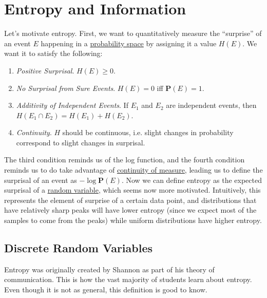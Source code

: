 \section{Entropy and Information}

  Let's motivate entropy. First, we want to quantitatively measure the ``surprise'' of an event $E$ happening in a \hyperref[prob-def:probability-space]{probability space} by assigning it a value $H(E)$. We want it to satisfy the following: 
  \begin{enumerate}
    \item \textit{Positive Surprisal}. $H(E) \geq 0$. 
    \item \textit{No Surprisal from Sure Events}. $H(E) = 0$ iff $\mathbf{P}(E) = 1$.
    \item \textit{Additivity of Independent Events}. If $E_1$ and $E_2$ are independent events, then $H(E_1 \cap E_2) = H(E_1) + H(E_2)$. 
    \item \textit{Continuity}. $H$ should be continuous, i.e. slight changes in probability correspond to slight changes in surprisal. 
  \end{enumerate}
  
  The third condition reminds us of the log function, and the fourth condition reminds us to do take advantage of \hyperref[mt-thm:continuity-of-measure]{continuity of measure}, leading us to define the surprisal of an event as $- \log \mathbf{P}(E)$. Now we can define entropy as the expected surprisal of a \hyperref[prob-def:random-variable]{random variable}, which seems now more motivated. Intuitively, this represents the element of surprise of a certain data point, and distributions that have relatively sharp peaks will have lower entropy (since we expect most of the samples to come from the peaks) while uniform distributions have higher entropy. 

\subsection{Discrete Random Variables}

  Entropy was originally created by Shannon as part of his theory of communication. This is how the vast majority of students learn about entropy. Even though it is not as general, this definition is good to know.  

